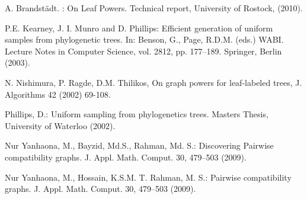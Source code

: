 \documentclass[dvipdfm]{llncs}
\begin{document}
\begin{thebibliography}{99}

\begin{small}


A. Brandst\"adt. : On Leaf Powers. Technical report, University of Rostock, (2010).

















P.E. Kearney, J. I. Munro and D. Phillips: Efficient generation of uniform samples from phylogenetic trees. In: Benson, G., Page, R.D.M. (eds.) WABI. Lecture Notes in Computer Science, vol. 2812, pp. 177--189. Springer, Berlin (2003).




N. Nishimura, P. Ragde, D.M. Thilikos, On graph powers for leaf-labeled trees, J. Algorithms 42 (2002) 69-108.

Phillips, D.: Uniform sampling from phylogenetics trees. Masters Thesis, University of Waterloo (2002).

Nur Yanhaona, M., Bayzid, Md.S., Rahman, Md. S.: Discovering Pairwise compatibility graphs. J. Appl. Math. Comput. 30, 479--503 (2009).

Nur Yanhaona, M., Hossain, K.S.M. T. Rahman, M. S.: Pairwise compatibility graphs. J. Appl. Math. Comput. 30, 479--503 (2009).

\end{small}
\end{thebibliography}
\end{document}
